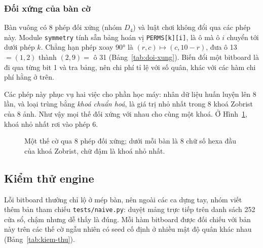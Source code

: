 \subsubsection{Đối xứng của bàn cờ}
Bàn vuông có 8 phép đối xứng (nhóm $D_4$) và luật chơi không đổi qua các phép này. Module \texttt{symmetry} tính sẵn bảng hoán vị \texttt{PERMS[k][i]}, là ô mà ô $i$ chuyển tới dưới phép $k$. Chẳng hạn phép xoay 90° là $(r, c) \mapsto (c, 10 - r)$, đưa ô 13 $= (1, 2)$ thành $(2, 9) =$ ô 31 (Bảng~\ref{tab:doi-xung}). Biến đổi một bitboard là đi qua từng bit 1 và tra bảng, nên chi phí tỉ lệ với số quân, khác với các hàm chi phí hằng ở trên.

\begin{table}[H]
  \centering\small
  \caption{Ảnh của ô 13 qua 8 phép đối xứng.}
  \label{tab:doi-xung}
  
\end{table}

Các phép này phục vụ hai việc cho phần học máy: nhân dữ liệu huấn luyện lên 8 lần, và loại trùng bằng \emph{khoá chuẩn hoá}, là giá trị nhỏ nhất trong 8 khoá Zobrist của 8 ảnh. Như vậy mọi thế đối xứng với nhau cho cùng một khoá. Ở Hình~\ref{fig:doi-xung}, khoá nhỏ nhất rơi vào phép 6.

\begin{figure}[H]
  \centering
  
  \caption{Một thế cờ qua 8 phép đối xứng; dưới mỗi bàn là 8 chữ số hexa đầu của khoá Zobrist, chữ đậm là khoá nhỏ nhất.}
  \label{fig:doi-xung}
\end{figure}

\subsection{Kiểm thử engine}
\label{sec:bb-kiem-thu}
Lỗi bitboard thường chỉ lộ ở mép bàn, nên ngoài các ca dựng tay, nhóm viết thêm bản tham chiếu \texttt{tests/naive.py}: duyệt mảng trực tiếp trên danh sách 252 cửa sổ, chậm nhưng dễ thấy là đúng. Mỗi hàm bitboard được đối chiếu với bản này trên các thế cờ ngẫu nhiên có seed cố định ở nhiều mật độ quân khác nhau (Bảng~\ref{tab:kiem-thu}).


